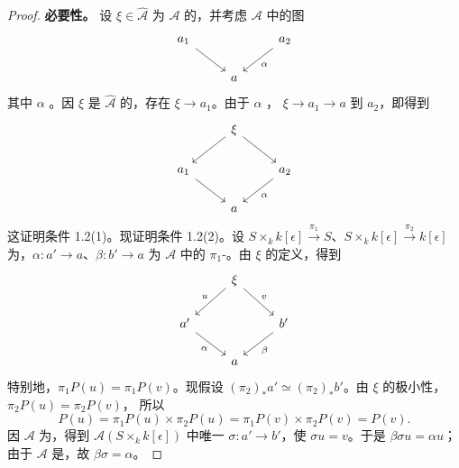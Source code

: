 \begin{proof}
\textbf{必要性。} 设 $\xi\in\widehat{\mathcal A}$ 为 $\mathcal A$ 的，并考虑 $\mathcal A$ 中的图
\[\begin{tikzcd}a_1\arrow[dr]&&a_2\arrow[dl,"\alpha"]\\&a&\end{tikzcd}\]
其中 $\alpha$ 。因 $\xi$ 是 $\widehat{\mathcal A}$ 的，存在 $\xi\to a_1$。由于 $\alpha$ ， $\xi\to a_1\to a$ 到 $a_2$，即得到
\[\begin{tikzcd}&\xi\arrow[dl]\arrow[dr]&\\a_1\arrow[dr]&&a_2\arrow[dl,"\alpha"]\\&a&\end{tikzcd}\]
这证明条件 1.2(1)。现证明条件 1.2(2)。设 $S\times_k k[\epsilon]\xrightarrow{\pi_1}S$、$S\times_k k[\epsilon]\xrightarrow{\pi_2}k[\epsilon]$ 为，$\alpha:a'\to a$、$\beta:b'\to a$ 为 $\mathcal A$ 中的 $\pi_1$-。由 $\xi$ 的定义，得到
\[\begin{tikzcd}&\xi\arrow[dl,"u"']\arrow[dr,"v"]&\\a'\arrow[dr,"\alpha"']&&b'\arrow[dl,"\beta"]\\&a&\end{tikzcd}\]
特别地，$\pi_1P(u)=\pi_1P(v)$。现假设 $(\pi_2)_*a'\simeq(\pi_2)_*b'$。由 $\xi$ 的极小性，$\pi_2P(u)=\pi_2P(v)$，
所以
\[P(u)=\pi_1P(u)\times\pi_2P(u)=\pi_1P(v)\times\pi_2P(v)=P(v).\]
因 $\mathcal A$ 为，得到 $\mathcal A(S\times_k k[\epsilon])$ 中唯一 $\sigma:a'\to b'$，使 $\sigma u=v$。于是 $\beta\sigma u=\alpha u$；由于 $\mathcal A$ 是，故 $\beta\sigma=\alpha$。


\end{proof}
